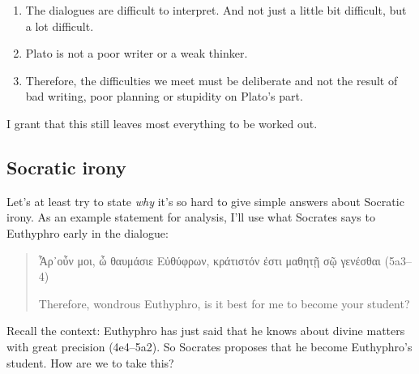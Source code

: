 \documentclass[11pt]{article}
\begin{document}
\begin{enumerate}
    \item The dialogues are difficult to interpret.  And not just a little bit difficult, but a lot difficult.
    \item Plato is not a poor writer or a weak thinker.
    \item Therefore, the difficulties we meet must be deliberate and not the result of bad writing, poor planning or stupidity on Plato's part.
\end{enumerate}

I grant that this still leaves most everything to be worked out.


\subsection{Socratic irony}

Let's at least try to state \emph{why} it's so hard to give simple answers about Socratic irony.  As an example statement for analysis, I'll use what Socrates says to Euthyphro early in the dialogue:

\begin{quote}
    {\g Ἆρ᾽οὖν μοι, ὦ θαυμάσιε Εὐθύφρων, κράτιστόν ἐστι μαθητῇ σῷ γενέσθαι} (5a3--4)

    Therefore, wondrous Euthyphro, is it best for me to become your student?
\end{quote}

Recall the context: Euthyphro has just said that he knows about divine matters with great precision (4e4--5a2).  So Socrates proposes that he become Euthyphro's student.  How are we to take this?
\end{document}
